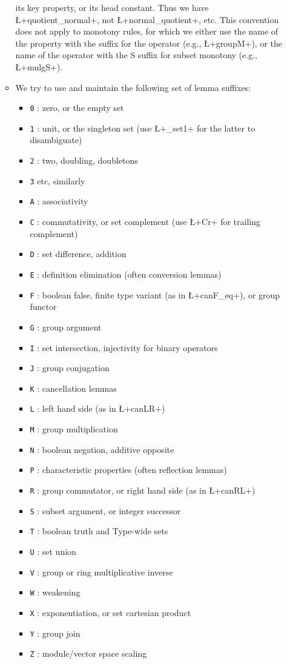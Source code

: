 \begin{itemize}
\begin{itemize}
    its key property, or its head constant.
    Thus we have \L+quotient_normal+, not \L+normal_quotient+, etc. This
    convention does not apply to monotony rules, for which we either
    use the name of the property with the suffix for the operator
    (e.g., \L+groupM+), or the name of the operator with the S
    suffix for subset monotony (e.g., \L+mulgS+).
  \item We try to use and maintain the following set of lemma suffixes:
    \begin{itemize}
    \item {\tt 0} : zero, or the empty set
    \item {\tt 1} : unit, or the singleton set (use \L+_set1+ for
      the latter to disambiguate)
    \item {\tt 2} : two, doubling, doubletons
    \item {\tt 3} etc, similarly
    \item {\tt A} : associativity
    \item {\tt C} : commutativity, or set complement (use \L+Cr+
      for trailing complement)
    \item {\tt D} : set difference, addition
    \item {\tt E} : definition elimination (often conversion
      lemmas)
    \item {\tt F} : boolean false, finite type variant (as in
      \L+canF_eq+), or group functor
    \item {\tt G} : group argument
    \item {\tt I} : set intersection, injectivity for binary operators
    \item {\tt J} : group conjugation
    \item {\tt K} : cancellation lemmas
    \item {\tt L} : left hand side (as in \L+canLR+)
    \item {\tt M} : group multiplication
    \item {\tt N} : boolean negation, additive opposite
    \item {\tt P} : characteristic properties (often reflection
      lemmas)
    \item {\tt R} : group commutator, or right hand side (as in
      \L+canRL+)
    \item {\tt S} : subset argument, or integer successor
    \item {\tt T} : boolean truth and Type-wide sets
    \item {\tt U} : set union
    \item {\tt V} : group or ring multiplicative inverse
    \item {\tt W} : weakening
    \item {\tt X} : exponentiation, or set cartesian product
    \item {\tt Y} : group join
    \item {\tt Z} : module/vector space scaling
    \end{itemize}
  \end{itemize}
\end{itemize}


